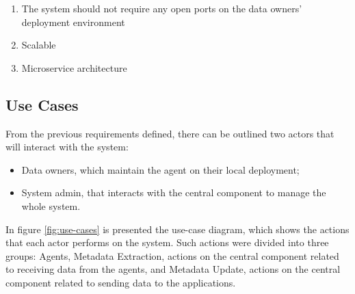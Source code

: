 \begin{enumerate}
    \item The system should not require any open ports on the data owners' deployment environment

    \item Scalable

    \item Microservice architecture
\end{enumerate}

\subsection{Use Cases}

From the previous requirements defined, there can be outlined two actors that will interact with the system:

\begin{itemize}
    \item Data owners, which maintain the agent on their local deployment;
    \item System admin, that interacts with the central component to manage the whole system.
\end{itemize}

In figure \ref{fig:use-cases} is presented the use-case diagram, which shows the actions that each actor performs on the system.
Such actions were divided into three groups: Agents, Metadata Extraction, actions on the central component related to receiving data from the agents, and Metadata Update, actions on the central component related to sending data to the applications.

